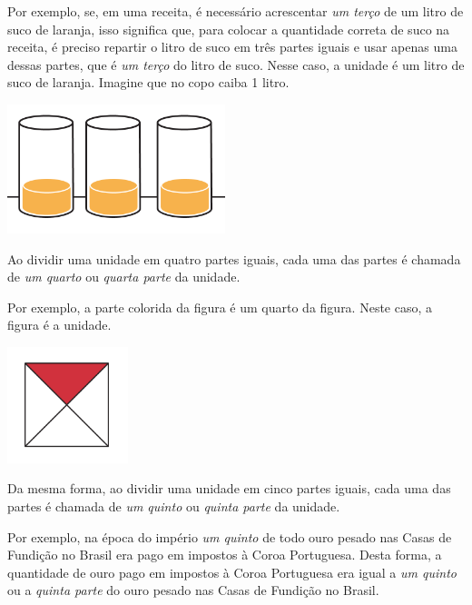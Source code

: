 Por exemplo, se, em uma receita, é necessário acrescentar {\it um terço} de um litro de suco de laranja, isso significa que, para colocar a quantidade correta de suco na receita, é preciso repartir o litro de suco em três partes iguais e usar apenas uma dessas partes, que é {\it um terço} do litro de suco. Nesse caso, a unidade é um litro de suco de laranja. Imagine que no copo caiba 1 litro.

\begin{center}
    \includegraphics[width=180pt, keepaspectratio]{../figuras/licao01/orgideias_fig03a.png}
  \end{center}

Ao dividir uma unidade em quatro partes iguais, cada uma das partes é chamada de {\it um quarto} ou {\it quarta parte} da unidade.

Por exemplo, a parte colorida da figura é um quarto da figura. Neste caso, a figura é a unidade.

\begin{center}
    \includegraphics[width=100pt, keepaspectratio]{../figuras/licao01/orgideias_fig04.png}
  \end{center}
Da mesma forma, ao dividir uma unidade em cinco partes iguais, cada uma das partes é chamada de {\it um quinto} ou {\it quinta parte} da unidade.

Por exemplo, na época do império \emph{um quinto} de todo ouro pesado nas Casas de Fundição no Brasil era pago em impostos à Coroa Portuguesa. Desta forma, a quantidade de ouro pago em impostos à Coroa Portuguesa era igual a \emph{um quinto} ou a \emph{quinta parte} do ouro pesado nas Casas de Fundição no Brasil.

